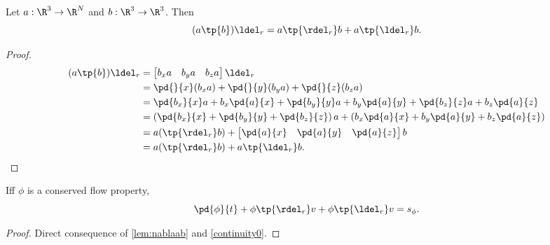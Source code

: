 \begin{lem}
Let $a:\R^3\to \R^N$ and $b:\R^3\to \R^3$.  Then
\begin{equation}
    \label{lem:nablaab}
    (a\tp{b})\ldel_r = a \tp{\rdel_r} b  + a \tp{\ldel_r} b.
\end{equation}
\end{lem}
\begin{proof}
    \begin{align}
        (a\tp{b})\ldel_r &= \begin{bmatrix}
            b_x a & b_y a & b_z a
        \end{bmatrix} \ldel_r \\
        &= \pd{}{x} (b_x a) + \pd{}{y} (b_y a) + \pd{}{z} (b_z a) \\
        &= \pd{b_x}{x} a + b_x \pd{a}{x} +
           \pd{b_y}{y} a + b_y \pd{a}{y} +
           \pd{b_z}{z} a + b_z \pd{a}{z} \\
        &= \left( \pd{b_x}{x} + \pd{b_y}{y} + \pd{b_z}{z} \right)a +
           \left(b_x \pd{a}{x} + b_y \pd{a}{y} + b_z \pd{a}{z} \right) \\
        &= a ( \tp{\rdel_r} b ) + \begin{bmatrix}
            \pd{a}{x} & \pd{a}{y} & \pd{a}{z}
        \end{bmatrix} b \\
        &= a (\tp{\rdel_r} b) + a \tp{\ldel_r} b.
    \end{align}
\end{proof}

\begin{thm}
Iff $\phi$ is a conserved flow property,
\begin{equation}
    \label{continuity}
    \pd{\phi}{t} + \phi \tp{\rdel_r} v +  \phi \tp{\ldel_r} v = s_\phi.
\end{equation}
\end{thm}
\begin{proof}
    Direct consequence of \autoref{lem:nablaab} and \autoref{continuity0}.
\end{proof}

